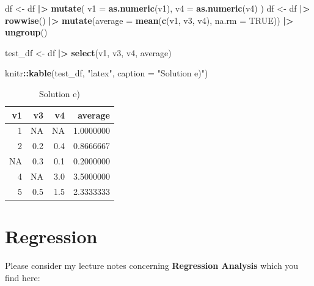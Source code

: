 \documentclass[
  doc]{apa6}
\newenvironment{Shaded}{\begin{snugshade}}{\end{snugshade}}
\newcommand{\AttributeTok}[1]{\textcolor[rgb]{0.13,0.29,0.53}{#1}}
\newcommand{\ConstantTok}[1]{\textcolor[rgb]{0.56,0.35,0.01}{#1}}
\newcommand{\FunctionTok}[1]{\textcolor[rgb]{0.13,0.29,0.53}{\textbf{#1}}}
\newcommand{\NormalTok}[1]{#1}
\newcommand{\OtherTok}[1]{\textcolor[rgb]{0.56,0.35,0.01}{#1}}
\newcommand{\SpecialCharTok}[1]{\textcolor[rgb]{0.81,0.36,0.00}{\textbf{#1}}}
\newcommand{\StringTok}[1]{\textcolor[rgb]{0.31,0.60,0.02}{#1}}
\begin{document}
\newpage

\begin{Shaded}
\begin{Highlighting}[]
\NormalTok{df }\OtherTok{\textless{}{-}}\NormalTok{ df }\SpecialCharTok{|\textgreater{}} 
  \FunctionTok{mutate}\NormalTok{(}
    \AttributeTok{v1 =} \FunctionTok{as.numeric}\NormalTok{(v1),}
    \AttributeTok{v4 =} \FunctionTok{as.numeric}\NormalTok{(v4)}
\NormalTok{  )}
\NormalTok{df }\OtherTok{\textless{}{-}}\NormalTok{ df }\SpecialCharTok{|\textgreater{}} 
  \FunctionTok{rowwise}\NormalTok{() }\SpecialCharTok{|\textgreater{}} 
  \FunctionTok{mutate}\NormalTok{(}\AttributeTok{average =} \FunctionTok{mean}\NormalTok{(}\FunctionTok{c}\NormalTok{(v1, v3, v4), }\AttributeTok{na.rm =} \ConstantTok{TRUE}\NormalTok{)) }\SpecialCharTok{|\textgreater{}} 
  \FunctionTok{ungroup}\NormalTok{()}

\NormalTok{test\_df }\OtherTok{\textless{}{-}}\NormalTok{ df }\SpecialCharTok{|\textgreater{}} 
  \FunctionTok{select}\NormalTok{(v1, v3, v4, average)}

\NormalTok{knitr}\SpecialCharTok{::}\FunctionTok{kable}\NormalTok{(test\_df, }\StringTok{"latex"}\NormalTok{, }\AttributeTok{caption =} \StringTok{"Solution e)"}\NormalTok{)}
\end{Highlighting}
\end{Shaded}

\begin{table}

\caption{\label{tab:unnamed-chunk-6}Solution e)}
\centering
\begin{tabular}[t]{r|r|r|r}
\hline
v1 & v3 & v4 & average\\
\hline
1 & NA & NA & 1.0000000\\
\hline
2 & 0.2 & 0.4 & 0.8666667\\
\hline
NA & 0.3 & 0.1 & 0.2000000\\
\hline
4 & NA & 3.0 & 3.5000000\\
\hline
5 & 0.5 & 1.5 & 2.3333333\\
\hline
\end{tabular}
\end{table}

\newpage

\hypertarget{regression}{%
\section{Regression}\label{regression}}

Please consider my lecture notes concerning \textbf{Regression Analysis} which you find here:
\end{document}
